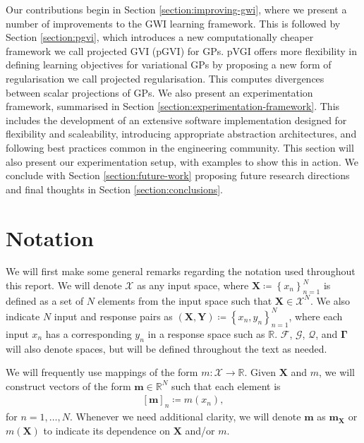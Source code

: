 \documentclass{article}
\numberwithin{equation}{section}
\begin{document}
Our contributions begin in Section \ref{section:improving-gwi}, where we present a number of improvements to the GWI learning framework.
This is followed by Section \ref{section:pgvi}, which introduces a new computationally cheaper framework we call projected GVI 
(pGVI) for GPs.
pVGI offers more flexibility in defining learning objectives for variational GPs by proposing a new form of regularisation we call projected regularisation.
This computes divergences between scalar projections of GPs.
We also present an experimentation framework, summarised in Section \ref{section:experimentation-framework}. 
This includes the development of an extensive software implementation designed for flexibility and scaleability, introducing appropriate abstraction architectures, and following best practices common in the engineering community. 
This section will also present our experimentation setup, with examples to show this in action. We conclude with Section \ref{section:future-work} proposing future research directions and final thoughts in Section \ref{section:conclusions}.

\newpage
\section{Notation}
We will first make some general remarks regarding the notation used throughout this report. 
We will denote $\mathcal{X}$ as any input space, where $\mathbf{X} \coloneqq \left\{x_n\right\}_{n=1}^N$ is defined as a set of $N$ elements from the input space such that $\mathbf{X} \in \mathcal{X}^N$.
We also indicate $N$ input and response pairs as $\left(\mathbf{X}, \mathbf{Y}\right) \coloneqq \left\{x_n, y_n\right\}_{n=1}^N$, where each input $x_n$ has a corresponding $y_n$ in a response space such as $\mathbb{R}$.
$\boldsymbol{\boldsymbol{\mathcal{F}}}$, $\boldsymbol{\mathcal{G}}$, $\boldsymbol{\mathcal{Q}}$, and $\boldsymbol{\Gamma}$ will also denote spaces, but will be defined throughout the text as needed.

We will frequently use mappings of the form $m: \mathcal{X} \rightarrow \mathbb{R}$. 
Given $\mathbf{X}$ and $m$, we will construct vectors of the form $\mathbf{m} \in \mathbb{R}^N$ such that each element is
\begin{align}
    \left[\mathbf{m}\right]_{n} \coloneqq m(x_n),
\end{align}
for $n=1,\dots, N$. Whenever we need additional clarity, we will denote $\mathbf{m}$ as $\mathbf{m}_{\mathbf{X}}$ or $m\left(\mathbf{X}\right)$ to indicate its dependence on $\mathbf{X}$ and/or $m$.
\end{document}
